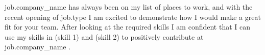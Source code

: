 {{job.company_name}} has always been on my list of places to work, and with the recent opening of {{job.type}} I am excited to demonstrate how I would make a great fit for your team. After looking at the required skills I am confident that I can use my skills in (skill 1) and (skill 2) to positively contribute at {{job.company_name}} .
 
